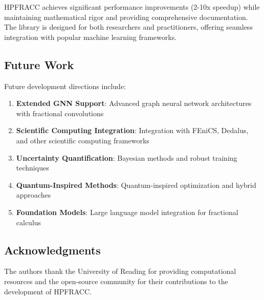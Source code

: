 \documentclass[12pt]{article}
\begin{document}
HPFRACC achieves significant performance improvements (2-10x speedup) while maintaining mathematical rigor and providing comprehensive documentation. The library is designed for both researchers and practitioners, offering seamless integration with popular machine learning frameworks.

\subsection{Future Work}

Future development directions include:

\begin{enumerate}
\item \textbf{Extended GNN Support}: Advanced graph neural network architectures with fractional convolutions
\item \textbf{Scientific Computing Integration}: Integration with FEniCS, Dedalus, and other scientific computing frameworks
\item \textbf{Uncertainty Quantification}: Bayesian methods and robust training techniques
\item \textbf{Quantum-Inspired Methods}: Quantum-inspired optimization and hybrid approaches
\item \textbf{Foundation Models}: Large language model integration for fractional calculus
\end{enumerate}

\subsection{Acknowledgments}

The authors thank the University of Reading for providing computational resources and the open-source community for their contributions to the development of HPFRACC.



\end{document}
